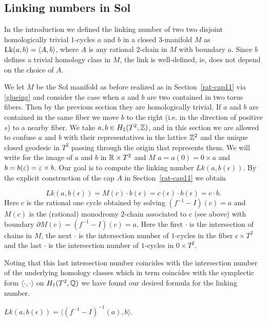 \subsection{Linking numbers in Sol} \label{generaltheoryoflink}


In the introduction we defined the linking number of two two disjoint homologically trivial $1$-cycles $a$ and $b$ in a closed $3$-manifold $M$ as $\operatorname{Lk}(a,b) = \langle A,b \rangle$, where $A$ is any rational $2$-chain in $M$ with boundary $a$. Since $b$ defines a trivial homology class in $M$, the link is well-defined, ie, does not depend on the choice of $A$. 

We let $M$ be the Sol manifold as before realized as in Section~\ref{rat-cap11} via \eqref{glueing} and consider the case when $a$ and $b$ are two contained in two torus fibers. Then by the previous section they are homologically trivial. If $a$ and $b$ are contained in the same fiber we move $b$ to the right (i.e. in the direction of positive $s$)  to a nearby fiber. We take $a,b \in H_1(T^2,\mathbb{Z})$, and in this section we are allowed to confuse $a$ and $b$ with their representatives in the lattice $\mathbb{Z}^2$ and the unique closed geodesic in $T^2$ passing through the origin that represents them. We will write for the image of $a$ and $b$ in $\mathbb{R} \times T^2$ and $M$ $a=a(0)=0 \times a$ and $b=b(\varepsilon)= \varepsilon \times b$. Our goal is to compute the linking number $Lk(a, b(\epsilon))$. By the explicit construction of the cap $A$ in Section~\ref{rat-cap11} we obtain

\begin{lemma}
 \[
 Lk(a,b(\epsilon)) = M(c) \cdot b(\epsilon) = c(\epsilon) \cdot b(\epsilon)= c \cdot b.
 \] 
Here $c$ is the rational one cycle obtained by solving $(f^{-1} - I) (c) =a$
and $M(c)$ is the (rational) monodromy $2$-chain associated to $c$ (see above) with boundary $\partial M(c) = (f^{-1} - I) (c) =a$. Here the first $\cdot$ is the intersection of 
chains in $M$, the next $\cdot$ is the intersection number of $1$-cycles in the fiber $\epsilon \times T^2$ and the last $\cdot$ is the intersection number of $1$-cycles in $0 \times T^2$. 
 \end{lemma}

Noting that this last intersection number coincides with the intersection number of the underlying homology classes which in term coincides with the symplectic form $\langle \cdot, \cdot \rangle$ on $H_1(T^2,\mathbb{Q})$ we have found our desired formula for the linking number.
\begin{theorem}\label{linkSol}
$ Lk(a, b(\epsilon)) = \langle (f^{-1} - I)^{-1} (a), b \rangle.$
\end{theorem}

